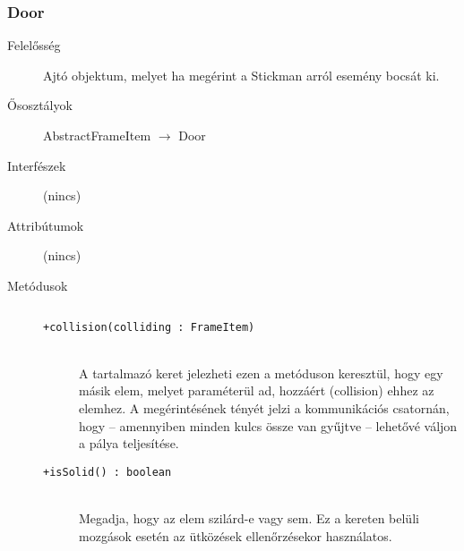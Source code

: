		\subsubsection{Door}
			\begin{description}

				\item[Felelősség] Ajtó objektum, melyet ha megérint a Stickman arról esemény bocsát ki.

				\item[Ősosztályok] AbstractFrameItem $\rightarrow{}$ Door
				\item[Interfészek] (nincs)
				\item[Attribútumok] (nincs)
				\item[Metódusok]$\ $
					\begin{description}
						\item[\texttt{+collision(colliding : FrameItem)}] \hfill \\A tartalmazó keret jelezheti ezen a metóduson keresztül,  hogy egy másik elem, melyet paraméterül ad,  hozzáért (collision) ehhez az elemhez.    A megérintésének tényét jelzi a kommunikációs csatornán,  hogy -- amennyiben minden kulcs össze van gyűjtve --  lehetővé váljon a pálya teljesítése. 
						\item[\texttt{+isSolid() : boolean}] \hfill \\Megadja, hogy az elem szilárd-e vagy sem.  Ez a kereten belüli mozgások esetén az  ütközések ellenőrzésekor használatos. 
					\end{description}
			\end{description}

